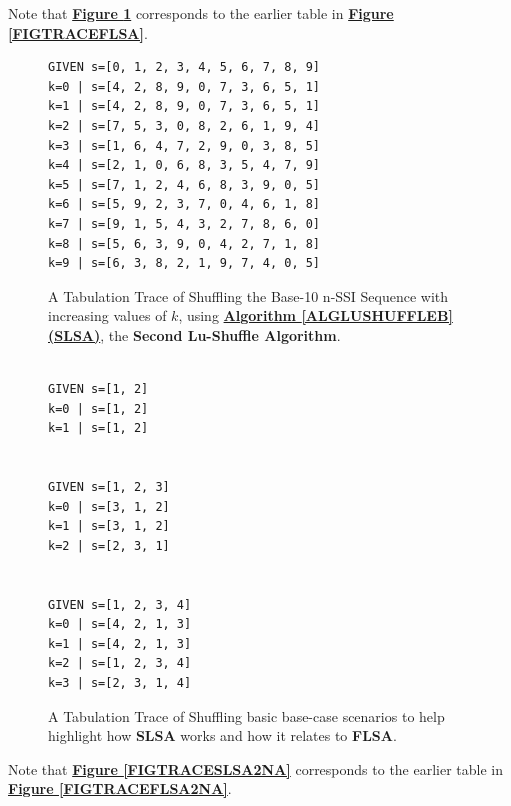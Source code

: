 \documentclass[a4paper, 18pt]{book} %
\begin{document}
Note that \textbf{\hyperref[FIGTRACESLSA]{Figure \ref{FIGTRACESLSA}}} corresponds to the earlier table in \textbf{\hyperref[FIGTRACEFLSA]{Figure \ref{FIGTRACEFLSA}}}.

\begin{figure}[H]
  \begin{center}
\LARGE
\begin{verbatim}
GIVEN s=[0, 1, 2, 3, 4, 5, 6, 7, 8, 9]
k=0 | s=[4, 2, 8, 9, 0, 7, 3, 6, 5, 1]
k=1 | s=[4, 2, 8, 9, 0, 7, 3, 6, 5, 1]
k=2 | s=[7, 5, 3, 0, 8, 2, 6, 1, 9, 4]
k=3 | s=[1, 6, 4, 7, 2, 9, 0, 3, 8, 5]
k=4 | s=[2, 1, 0, 6, 8, 3, 5, 4, 7, 9]
k=5 | s=[7, 1, 2, 4, 6, 8, 3, 9, 0, 5]
k=6 | s=[5, 9, 2, 3, 7, 0, 4, 6, 1, 8]
k=7 | s=[9, 1, 5, 4, 3, 2, 7, 8, 6, 0]
k=8 | s=[5, 6, 3, 9, 0, 4, 2, 7, 1, 8]
k=9 | s=[6, 3, 8, 2, 1, 9, 7, 4, 0, 5]
\end{verbatim}

   \caption{A Tabulation Trace of Shuffling the Base-10 n-SSI Sequence with increasing values of $k$, using \textbf{\hyperref[ALGLUSHUFFLEB]{Algorithm \ref{ALGLUSHUFFLEB} (SLSA)}}, the \textbf{Second Lu-Shuffle Algorithm}.}
  \label{FIGTRACESLSA}
  \end{center}
\end{figure}


\begin{figure}[H]
  \begin{center}
\LARGE
\begin{verbatim}

GIVEN s=[1, 2]
k=0 | s=[1, 2]
k=1 | s=[1, 2]


GIVEN s=[1, 2, 3]
k=0 | s=[3, 1, 2]
k=1 | s=[3, 1, 2]
k=2 | s=[2, 3, 1]


GIVEN s=[1, 2, 3, 4]
k=0 | s=[4, 2, 1, 3]
k=1 | s=[4, 2, 1, 3]
k=2 | s=[1, 2, 3, 4]
k=3 | s=[2, 3, 1, 4]
\end{verbatim}

   \caption{A Tabulation Trace of Shuffling basic base-case scenarios to help highlight how \textbf{SLSA} works and how it relates to \textbf{FLSA}.}
  \label{FIGTRACESLSASIMPLE}
  \end{center}
\end{figure}



Note that \textbf{\hyperref[FIGTRACESLSA2NA]{Figure \ref{FIGTRACESLSA2NA}}} corresponds to the earlier table in \textbf{\hyperref[FIGTRACEFLSA2NA]{Figure \ref{FIGTRACEFLSA2NA}}}.
\end{document}
